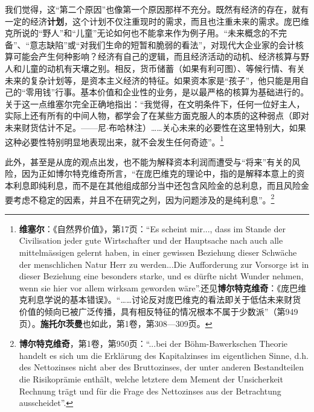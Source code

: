 \documentclass[fontset=fandol, a4paper, 12pt, openright]{ctexbook}
\begin{document}
我们觉得，这“第二个原因”也像第一个原因那样不充分。既然有经济的存在，就有一定的经济\textbf{计划}，这个计划不仅注重现时的需求，而且也注重未来的需求。庞巴维克所说的“野人”和“儿童”无论如何也不能拿来作为例子用。“未来概念的不完备”、“意志缺陷”或“对我们生命的短暂和脆弱的看法”，对现代大企业家的会计核算可能会产生何种影响？经济有自己的逻辑，而且经济活动的动机、经济核算与野人和儿童的动机有天壤之别。相反，货币储蓄（如果有利可图）、等候行情、有关未来的复杂计划等，是资本主义经济的特征。如果资本家是“孩子”，他只能是用自己的“零用钱”行事。基本价值和企业性的业务，是以最严格的核算为基础进行的。关于这一点维塞尔完全正确地指出：“我觉得，在文明条件下，任何一位好主人，实际上还有所有的中间人物，都学会了在某些方面克服人的本质的这种弱点（即对未来财货估计不足。——尼$\cdot$布哈林注）……关心未来的必要性在这里特别大，如果这种必要性特别明显地表现出来，就不会发生任何奇迹”。\footnote{\textbf{维塞尔}：《自然界价值》，第17页：“Es scheint mir..., dass im Stande der Civilisation jeder gute Wirtschafter und der Hauptsache nach auch alle mittelm\"{a}ssigen gelernt haben, in einer gewissen Beziehung dieser Schw\"{a}che der menschlichen Natur Herr zu werden...Die Aufforderung zur Vorsorge ist in dieser Beziehung eine besonders starke, und es d\"{u}rfte nicht Wunder nehmen, wenn sie hier vor allem wirksam geworden w\"{a}re”.还见\textbf{博尔特克维奇}：《庞巴维克利息学说的基本错误》。“……讨论反对庞巴维克的看法即关于低估未来财货价值的倾向已被广泛传播，具有相反特征的情况根本不属于少数派”（第949页）。\textbf{施托尔茨曼}也如此，第1卷，第308—309页。}

此外，甚至是从庞的观点出发，也不能为解释资本利润而遭受与“将来”有关的风险，因为正如博尔特克维奇所言，“在庞巴维克的理论中，指的是解释本意上的资本利息即纯利息，而不是在其他组成部分当中还包含风险金的总利息，而且风险金要考虑不稳定的因素，并且不在研究之列，因为问题涉及的是纯利息”。\footnote{\textbf{博尔特克维奇}，第1卷，第950页：“...bei der B\"{o}hm-Bawerkschen Theorie handelt es sich um die Erkl\"{a}rung des Kapitalzinses im eigentlichen Sinne, d.h. des Nettozinses nicht aber des Bruttozinses, der unter anderen Bestandteilen die Risikopr\"{a}mie enth\"{a}lt, welche letztere dem Mement der Unsicherkeit Rechnung tr\"{a}gt und f\"{u}r die Frage des Nettozinses aus der Betrachtung ausscheidet”.}
\end{document}
